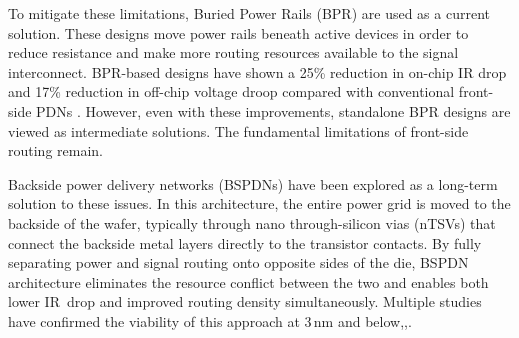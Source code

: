 To mitigate these limitations, Buried Power Rails (BPR) are used as a current solution. These designs move power rails beneath active devices in order to reduce resistance and make more routing resources available to the signal interconnect. BPR-based designs have shown a 25\% reduction in on-chip IR drop and 17\% reduction in off-chip voltage droop compared with conventional front-side PDNs \cite{9817394}. However, even with these improvements, standalone BPR designs are viewed as intermediate solutions\cite{10244504}. The fundamental limitations of front-side routing remain.

Backside power delivery networks (BSPDNs) have been explored as a long-term solution to these issues. In this architecture, the entire power grid is moved to the backside of the wafer, typically through nano through-silicon vias (nTSVs) that connect the backside metal layers directly to the transistor contacts. By fully separating power and signal routing onto opposite sides of the die, BSPDN architecture eliminates the resource conflict between the two and enables both lower IR~drop and improved routing density simultaneously. Multiple studies have confirmed the viability of this approach at 3\,nm and below\cite{10631463},\cite{8932458},\cite{10244504}.

